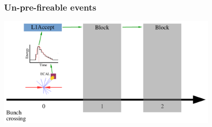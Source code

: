 \documentclass[aspectratio=169,xcolor=dvipsnames,,table,compress]{beamer}
\begin{document}
\begin{frame} \frametitle{Un-pre-fireable events}
  \vspace{-5mm}
  \centering
        \includegraphics[width=0.8\textwidth,page=3]{../figures/vbf/triggers/l1diag.pdf}
\end{frame}

% 
% 

\backupend
\end{document}
